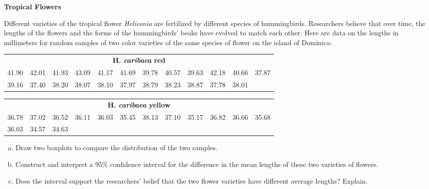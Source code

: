 \documentclass[a4paper, 12pt,twoside]{book}
\begin{document}
 \colorbox{champagne}{\parbox{\textwidth}{
 \textbf{Tropical Flowers}\vspace{0.3cm}
 
  Different varieties of the tropical flower \textit{Heliconia} are fertilized by different species of hummingbirds. Researchers believe that over time, the lengths of the flowers and the forms of the hummingbirds’ beaks have evolved to match each other. Here are data on the lengths in millimeters for random samples of two color varieties of the same species of flower on the island of Dominica:
  \begin{table}[H]
  \hspace{-0.5cm}
  \small{
   \begin{tabular}{ccccc ccccc cc}
   \hline
   \multicolumn{12}{c}{\textbf{H.\textit{ caribaea} red}}\\
   41.90&42.01&41.93&43.09&41.17&41.69&39.78&40.57&
   39.63 & 42.18 & 40.66 & 37.87 \\
   39.16 & 37.40 & 38.20&  38.07 & 38.10 & 37.97 & 38.79 &       38.23 & 38.87 & 37.78 & 38.01&\\
   \hline
   \end{tabular}
   }
  \end{table} 
    \begin{table}[H]
  \hspace{-0.5cm}
  \small{
   \begin{tabular}{ccccc ccccc cc}
   \hline
   \multicolumn{12}{c}{\textbf{H.\textit{ caribaea} yellow}}\\
36.78 &37.02 &36.52 &36.11 &36.03& 35.45& 38.13 &37.10 &35.17 &36.82 &36.66 &35.68 \\
36.03 &34.57 &34.63 \\
   \hline
   \end{tabular}
   }
  \end{table}
  \begin{enumerate}[(a)]
      \item Draw two boxplots to compare the distribution of the two samples.
      \item Construct and interpret a 95\% confidence interval for the difference in the mean lengths of these two varieties of flowers.
      \item Does the interval support the researchers’ belief that the two flower varieties have different average lengths? Explain.
  \end{enumerate} 
 }}
    
\end{document}
